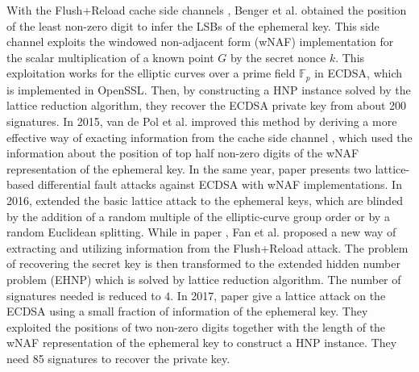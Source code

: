 With the Flush+Reload cache side channels \cite{flushreload},
	Benger et al. \cite{Benger2014} obtained the position of the least non-zero digit to infer the LSBs of the ephemeral key.
This side channel exploits
	the windowed non-adjacent form (wNAF) implementation \cite{GORDON1998129,Miyaji1997,Koyama1002,Solinas2000}
	for the scalar multiplication	
		of a known point $G$ by the secret nonce $k$.
This exploitation works for the elliptic curves over a prime field $\mathbb{F}_{p}$
			in ECDSA, which is implemented in OpenSSL\cite{openssl}.
Then,
	by constructing a HNP instance solved by the lattice reduction algorithm, they recover the ECDSA private key from about 200 signatures.
In 2015, van de Pol et al. improved this method by deriving a more effective way of exacting information from the cache side channel \cite{Van2015}, 
 which used the information about the position of top half non-zero digits of the wNAF representation of the ephemeral key.
In the same year, paper \cite{Cao2015} presents two lattice-based differential fault attacks against ECDSA with wNAF implementations.
In 2016, \cite{Dahmun2016}  extended the basic lattice attack to the ephemeral keys,  which are blinded by the addition of a random multiple of the elliptic-curve group order or by a random Euclidean splitting.
While in paper \cite{Fan2016}, Fan et al. proposed a new way of extracting and utilizing information from the Flush+Reload attack. The problem of recovering the
secret key is then transformed to the extended hidden number problem (EHNP) which is solved by lattice reduction algorithm. The number of signatures needed is reduced to $4$.
In 2017, paper \cite{Wang2017} give a lattice attack on the ECDSA using
 a small fraction of information of the ephemeral key.
They exploited the positions of two non-zero digits together with the length of the wNAF representation of the ephemeral key to construct a HNP instance. They need 85 signatures to recover the private key.



